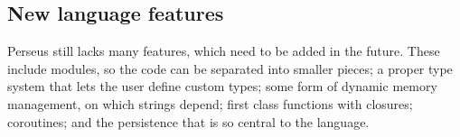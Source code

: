 		\subsection{New language features}
		
		Perseus still lacks many features, which need to be added in the future. These include modules, so the code can be separated into smaller pieces; a proper type system that lets the user define custom types; some form of dynamic memory management, on which strings depend; first class functions with closures; coroutines; and the persistence that is so central to the language.
